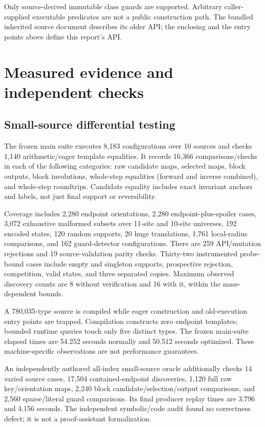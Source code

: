 \documentclass[11pt,a4paper]{article}
\numberwithin{equation}{section}
\newcommand{\file}[1]{\texttt{\detokenize{#1}}}
\begin{document}
Only source-derived immutable class guards are supported. Arbitrary caller-supplied executable predicates are not a public construction path. The bundled inherited source document describes its older API; the enclosing \file{SparseParallelCompiler} and the entry points above define this report's API.

\section{Measured evidence and independent checks}
\subsection{Small-source differential testing}
The frozen main suite executes 8,183 configurations over 10 sources and checks 1,140 arithmetic/eager template equalities. It records 16,366 comparisons/checks in each of the following categories: raw candidate maps, selected maps, block outputs, block involutions, whole-step equalities (forward and inverse combined), and whole-step roundtrips. Candidate equality includes exact invariant anchors and labels, not just final support or reversibility.

Coverage includes 2,280 endpoint orientations, 2,280 endpoint-plus-spoiler cases, 3,072 exhaustive malformed subsets over 11-site and 10-site universes, 192 encoded states, 120 random supports, 20 huge translations, 1,761 local-radius comparisons, and 162 guard-detector configurations. There are 259 API/mutation rejections and 19 source-validation parity checks. Thirty-two instrumented probe-bound cases include empty and singleton supports, prospective rejection, competition, valid states, and three separated copies. Maximum observed discovery counts are 8 without verification and 16 with it, within the mass-dependent bounds.

A 780,035-type source is compiled while eager construction and old-execution entry points are trapped. Compilation constructs zero endpoint templates; bounded runtime queries touch only five distinct types. The frozen main-suite elapsed times are 54.252 seconds normally and 50.512 seconds optimized. These machine-specific observations are not performance guarantees.

An independently authored all-index small-source oracle additionally checks 14 varied source cases, 17,504 contained-endpoint discoveries, 1,120 full raw key/orientation maps, 2,240 block candidate/selection/output comparisons, and 2,560 sparse/literal guard comparisons. Its final producer replay times are 3.796 and 4.156 seconds. The independent symbolic/code audit found no correctness defect; it is not a proof-assistant formalization.
\end{document}
